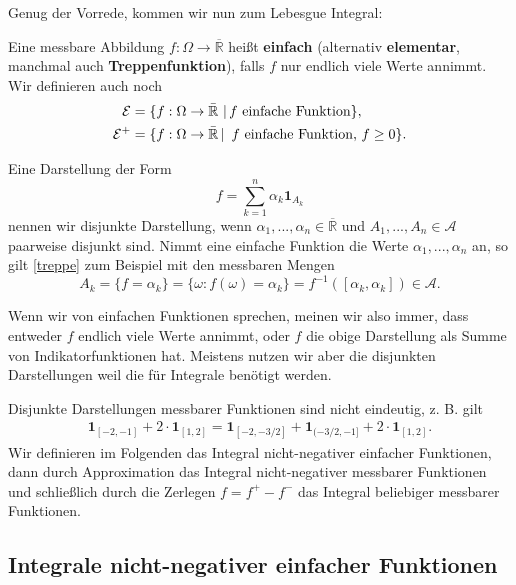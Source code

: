 Genug der Vorrede, kommen wir nun zum Lebesgue Integral:
\begin{deff}
	Eine messbare Abbildung $f \! : \Omega \rightarrow \overline{\mathbb{R}}$ heißt \textbf{einfach} (alternativ \textbf{elementar}, manchmal auch \textbf{Treppenfunktion}), falls $f$ nur endlich viele Werte annimmt. Wir definieren auch noch
	\begin{align*}
		\mathcal{E} &= \{f:\Omega \to \bar {\mathbb{R}} \ |  \,\text{$f$ einfache Funktion}\},\\
		\mathcal{E}^+ &= \{f: \Omega \to \bar {\mathbb{R}} \, | \, \text{ $f$ einfache Funktion, }f \geq 0\}.
	\end{align*}
\end{deff}
	Eine Darstellung der Form
	\begin{equation}\label{treppe}
		f = \sum\limits_{k = 1}^{n} \alpha_k \mathbf{1}_{A_k}
	\end{equation}
	nennen wir disjunkte Darstellung, wenn $\alpha_1,...,\alpha_n\in \overline{\mathbb{R}}$ und $A_1,...,A_n\in \mathcal A$ paarweise disjunkt sind. Nimmt eine einfache Funktion die Werte $\alpha_1,...,\alpha_n$ an, so gilt \eqref{treppe} zum Beispiel mit den messbaren Mengen	
	\begin{equation*}
		A_k  = \{ f = \alpha_k \} = \{ \omega \! : f(\omega)=\alpha_k \}= f^{-1} ( [\alpha_k,\alpha_k]) \in \mathcal A.
	\end{equation*}
\begin{bem1}
	Wenn wir von einfachen Funktionen sprechen, meinen wir also immer, dass entweder $f$ endlich viele Werte annimmt, oder $f$ die obige Darstellung als Summe von Indikatorfunktionen hat. Meistens nutzen wir aber die disjunkten Darstellungen weil die f\"ur Integrale ben\"otigt werden.
\end{bem1}	
	Disjunkte Darstellungen messbarer Funktionen sind nicht eindeutig, z. B. gilt
	\begin{align*}
		 \mathbf{1}_{[-2,-1]} + 2\cdot\mathbf{1}_{[1,2]}=\mathbf{1}_{[-2,-3/2]} + \mathbf{1}_{(-3/2,-1]} +2\cdot\mathbf{1}_{[1,2]}.
	\end{align*}
Wir definieren im Folgenden das Integral nicht-negativer einfacher Funktionen, dann durch Approximation das Integral nicht-negativer messbarer Funktionen und schlie\ss lich durch die Zerlegen $f=f^+-f^-$ das Integral beliebiger messbarer Funktionen.
\subsection*{Integrale nicht-negativer einfacher Funktionen}

